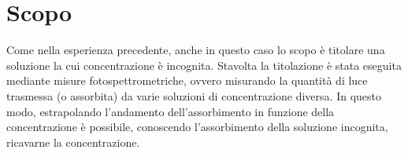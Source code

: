 \section*{Scopo}

Come nella esperienza precedente, anche in questo caso lo scopo è titolare una
soluzione la cui concentrazione è incognita. Stavolta la titolazione è stata
eseguita mediante misure fotospettrometriche, ovvero misurando la quantità di
luce trasmessa (o assorbita) da varie soluzioni di concentrazione diversa.
In questo modo, estrapolando l'andamento dell'assorbimento in funzione della
concentrazione è possibile, conoscendo l'assorbimento della soluzione incognita,
ricavarne la concentrazione.
